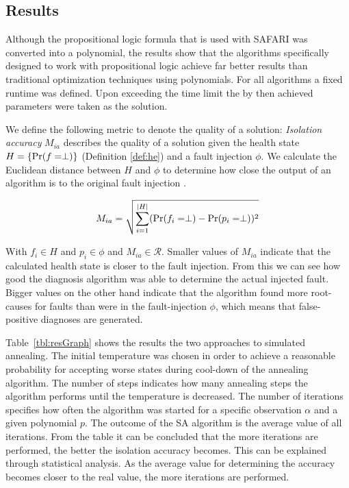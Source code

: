 \documentclass{article}
\begin{document}
\subsection{Results}

Although the propositional logic formula that is used with SAFARI was
converted into a polynomial, the results show that the algorithms
specifically designed to work with propositional logic achieve far
better results than traditional optimization techniques using
polynomials. For all algorithms a fixed runtime was defined. Upon
exceeding the time limit the by then achieved parameters were taken as
the solution.

We define the following metric to denote the quality of a solution:
\emph{Isolation accuracy} $M_{ia} $ describes the quality of a
solution given the health state $H = \{\mbox{Pr}(f = \perp)\}$ (Definition
\ref{def:he}) and a fault injection $\phi$. We calculate the Euclidean
distance between $H$ and $\phi$ to determine how close the output of
an algorithm is to the original fault injection \cite{stern2015many}.

\begin{equation}
M_{ia} = \sqrt{\sum_{i=1}^{|H|} (\mbox{Pr}(f_i = \perp) - \mbox{Pr}(p_i = \perp))^2}
\end{equation}

With $f_i \in H$ and $p_i \in \phi$ and $M_{ia} \in
\mathcal{R}$. Smaller values of $M_{ia}$ indicate that the calculated
health state is closer to the fault injection. From this we can see
how good the diagnosis algorithm was able to determine the actual
injected fault. Bigger values on the other hand indicate that the
algorithm found more root-causes for faults than were in the
fault-injection $\phi$, which means that false-positive diagnoses are
generated.

Table~\ref{tbl:resGraph} shows the results the two approaches to
simulated annealing. The initial temperature was chosen in order to
achieve a reasonable probability for accepting worse states during
cool-down of the annealing algorithm. The number of steps indicates
how many annealing steps the algorithm performs until the temperature
is decreased. The number of iterations specifies how often the
algorithm was started for a specific observation $\alpha$ and a given
polynomial $p$. The outcome of the SA algorithm is the average value
of all iterations. From the table it can be concluded that the more
iterations are performed, the better the isolation accuracy
becomes. This can be explained through statistical analysis. As the
average value for determining the accuracy becomes closer to the real
value, the more iterations are performed.
\end{document}

